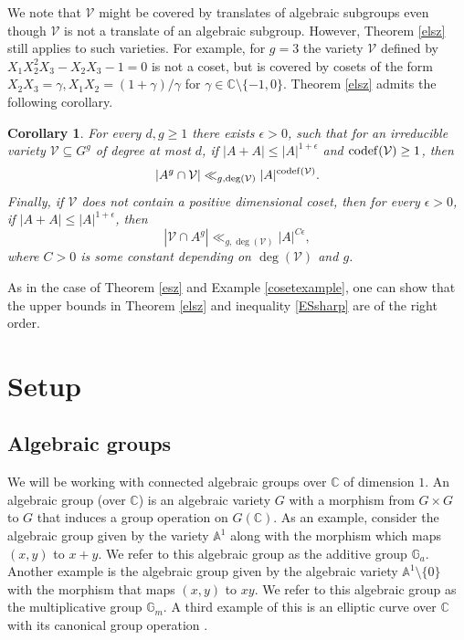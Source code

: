 \documentclass[12pt, reqno]{amsart}
\newcommand{\G}{\mathbb{G}}
\newcommand{\C}{\mathbb{C}}
\newtheorem{cor}[theorem]{Corollary}
\theoremstyle{remark}
\theoremstyle{definition}
\numberwithin{equation}{section}
\begin{document}
We note that $\mathcal{V}$ might be covered by translates of algebraic subgroups even though $\mathcal{V}$ is not a translate of an algebraic subgroup. However, Theorem \ref{elsz} still applies to such varieties. For example, for $g = 3$ the variety $\mathcal{V}$ defined by $X_1X_2^2X_3 - X_2X_3 - 1 =0$ is not a coset, but is covered by cosets of the form $X_2X_3 = \gamma, X_1X_2 = (1 + \gamma)/\gamma $ for $\gamma \in \C \setminus \{-1, 0\}$. Theorem \ref{elsz} admits the following corollary.

\begin{cor}
   For every $d,g \geq 1$ there exists $\epsilon > 0$, such that for an irreducible variety $\mathcal{V}\subseteq G^g$ of degree at most $d$, if $|A + A|\leq |A|^{1 + \epsilon}$ and ${\rm codef}(\mathcal{V}) \geq 1$, then
   \begin{align}\label{ESsharp} |A^g \cap \mathcal{V}|\ll_{g, \deg(\mathcal{V})}|A|^{{\rm codef}(\mathcal{V})}.
   \end{align}
   Finally, if $\mathcal{V}$ does not contain a positive dimensional coset, then for every $\epsilon > 0$, if $|A + A|\leq |A|^{1 + \epsilon}$, then 
   $$|\mathcal{V}\cap A^g|\ll_{g,\deg(\mathcal{V})}|A|^{C\epsilon}, $$
   where $C>0$ is some constant depending on $\deg(\mathcal{V})$ and $g$.
\end{cor}

As in the case of Theorem \ref{esz} and Example \ref{cosetexample}, one can show that the upper bounds in Theorem \ref{elsz} and inequality \ref{ESsharp} are of the right order. 



\section{Setup} \label{setupsec}

\subsection{Algebraic groups}

We will be working with connected algebraic groups over $\C$ of dimension $1$. An algebraic group (over $\C$) is an algebraic variety $G$ with a morphism from $G \times G $ to $G$ that induces a group operation on $G(\C)$. As an example, consider the algebraic group given by the variety $\mathbb{A}^1$ along with the morphism  which maps $(x,y)$ to $x+y$. We refer to this algebraic group as the additive group $\mathbb{G}_a$. Another example is the algebraic group given by the algebraic variety $\mathbb{A}^1 \setminus \{0\}$ with the morphism that maps $(x,y)$ to $xy$. We refer to this algebraic group as the multiplicative group $\G_m$. A third example of this is an elliptic curve over $\mathbb{C}$ with its canonical group operation \cite[III.2]{Silverman_the_arithmetic_of_elliptic_curves}.
\end{document}
